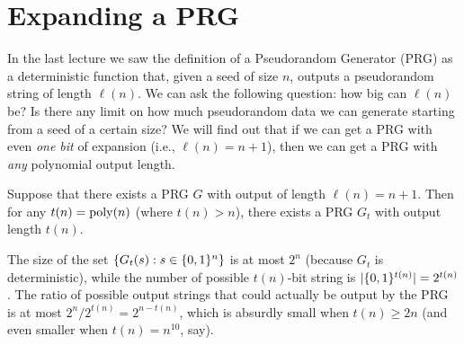 \documentclass[11pt]{article}
\begin{document}
\thispagestyle{fancy}           %


\section{Expanding a PRG}
\label{sec:expanding-prg}

In the last lecture we saw the definition of a Pseudorandom Generator
(PRG) as a deterministic function that, given a seed of size $n$,
outputs a pseudorandom string of length $\ell(n)$.  We can ask the
following question: how big can $\ell(n)$ be?  Is there any limit on
how much pseudorandom data we can generate starting from a seed of a
certain size?  We will find out that if we can get a PRG with even
\emph{one bit} of expansion (i.e., $\ell(n) = n+1$), then we can get a
PRG with \emph{any} polynomial output length.

\begin{theorem}
  \label{thm:prg-expansion}
  Suppose that there exists a PRG $G$ with output of length
  $\ell(n)=n+1$.  Then for any $t(n)=\operatorname{poly}(n)$ (where $t(n) > n$),
  there exists a PRG $G_t$ with output length $t(n)$.
\end{theorem}

\begin{remark}
  The size of the set $\{G_{t}(s) : s \in \{0,1\}^{n}\}$ is at most
  $2^n$ (because $G_{t}$ is deterministic), while the number of
  possible $t(n)$-bit string is $|\{0,1\}^{t(n)}| = 2^{t(n)}$.  The ratio
  of possible output strings that could actually be output by the PRG
  is at most $2^n/2^{t(n)}= 2^{n-t(n)}$, which is absurdly small when
  $t(n) \geq 2n$ (and even smaller when $t(n) = n^{10}$, say).
\end{remark}
\end{document}
